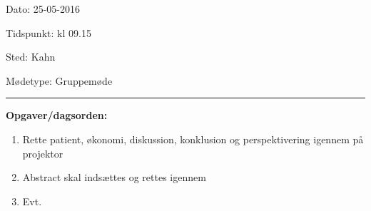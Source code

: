 Dato: \tabto{7em} 25-05-2016

Tidspunkt: \tabto{7em} kl 09.15

Sted: \tabto{7em} Kahn 

Mødetype: \tabto{7em} Gruppemøde \newline


\hrule
\textbf{Opgaver/dagsorden:} \newline
\begin{enumerate}
	\item Rette patient, økonomi, diskussion, konklusion og perspektivering igennem på projektor
	\item Abstract skal indsættes og rettes igennem
	\item Evt. 
\end{enumerate}